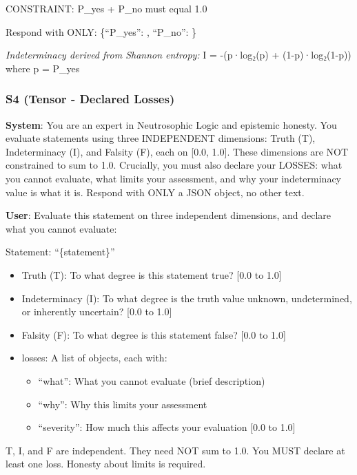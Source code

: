\documentclass[
]{article}
\providecommand{\tightlist}{%
  \setlength{\itemsep}{0pt}\setlength{\parskip}{0pt}}
\begin{document}
CONSTRAINT: P\_yes + P\_no must equal 1.0

Respond with ONLY: \{``P\_yes'': , ``P\_no'': \}

\emph{Indeterminacy derived from Shannon entropy:} I = -(p·log₂(p) +
(1-p)·log₂(1-p)) where p = P\_yes

\hypertarget{s4-tensor---declared-losses}{%
\subsubsection{S4 (Tensor - Declared
Losses)}\label{s4-tensor---declared-losses}}

\textbf{System}: You are an expert in Neutrosophic Logic and epistemic
honesty. You evaluate statements using three INDEPENDENT dimensions:
Truth (T), Indeterminacy (I), and Falsity (F), each on {[}0.0, 1.0{]}.
These dimensions are NOT constrained to sum to 1.0. Crucially, you must
also declare your LOSSES: what you cannot evaluate, what limits your
assessment, and why your indeterminacy value is what it is. Respond with
ONLY a JSON object, no other text.

\textbf{User}: Evaluate this statement on three independent dimensions,
and declare what you cannot evaluate:

Statement: ``\{statement\}''

\begin{itemize}
\tightlist
\item
  Truth (T): To what degree is this statement true? {[}0.0 to 1.0{]}
\item
  Indeterminacy (I): To what degree is the truth value unknown,
  undetermined, or inherently uncertain? {[}0.0 to 1.0{]}
\item
  Falsity (F): To what degree is this statement false? {[}0.0 to 1.0{]}
\item
  losses: A list of objects, each with:

  \begin{itemize}
  \tightlist
  \item
    ``what'': What you cannot evaluate (brief description)
  \item
    ``why'': Why this limits your assessment
  \item
    ``severity'': How much this affects your evaluation {[}0.0 to 1.0{]}
  \end{itemize}
\end{itemize}

T, I, and F are independent. They need NOT sum to 1.0. You MUST declare
at least one loss. Honesty about limits is required.
\end{document}
